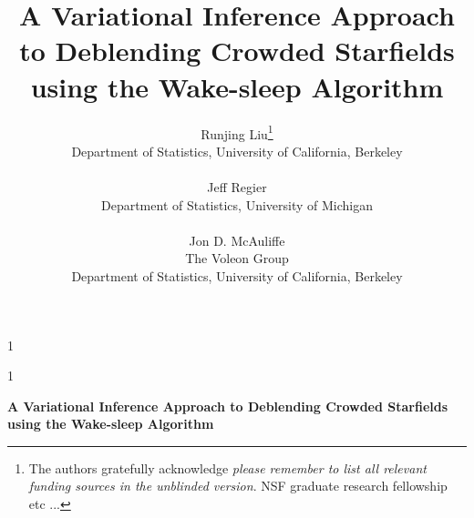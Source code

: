 \documentclass[12pt]{article}
\newcommand{\blind}{1}
\begin{document}
%

\def\spacingset#1{\renewcommand{\baselinestretch}%
{#1}\small\normalsize} \spacingset{1}


\blind
{
  \title{\bf  A Variational Inference Approach to Deblending Crowded Starfields using the Wake-sleep Algorithm}
  \author{Runjing Liu\thanks{
    The authors gratefully acknowledge \textit{please remember to list all relevant funding sources in the unblinded version}. NSF graduate research fellowship etc ... }\hspace{.2cm}\\
    Department of Statistics, University of California, Berkeley\\
    \\
    Jeff Regier \\
    Department of Statistics, University of Michigan\\
    \\
    Jon D. McAuliffe \\
    The Voleon Group \\
    Department of Statistics, University of California, Berkeley}
  \maketitle
} \fi

\blind
{
  \bigskip
  \bigskip
  \bigskip
  \begin{center}
    {\LARGE\bf A Variational Inference Approach to Deblending Crowded Starfields using the Wake-sleep Algorithm}
\end{center}
  \medskip
} \fi
\end{document}
